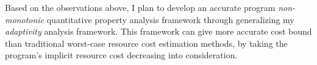  Based on the observations above, 
 I plan to develop
 an accurate program \emph{non-monotonic} quantitative property analysis framework through generalizing 
 my \emph{adaptivity} analysis framework.
 This framework can give more accurate cost bound than traditional worst-case resource cost estimation methods,
 by taking the program's implicit resource cost decreasing into consideration.

